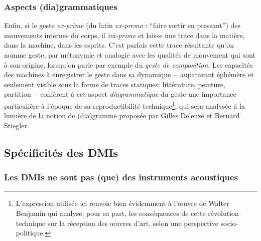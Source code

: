 \subsubsection{Aspects (dia)grammatiques}

\noindent Enfin, si le geste \textit{ex-prime} (du latin \textit{ex-premo} : ``faire sortir en pressant'') des mouvements internes du corps, il \textit{im-prime} et laisse une trace dans la matière, dans la machine, dans les esprits. C'est parfois cette trace résultante qu'on nomme geste, par métonymie et analogie avec les qualités de mouvement qui sont à son origine, lorsqu'on parle par exemple du \textit{geste de composition}. Les capacités des machines à enregistrer le geste dans sa dynamique --~auparavant éphémère et seulement visible sous la forme de traces statiques: littérature, peinture, partition~-- confèrent à cet aspect \textit{diagrammatique} du geste une importance particulière à l'époque de sa reproductibilité technique\footnote{L'expression utilisée ici renvoie bien évidemment à l'œuvre de Walter Benjamin \cite{benjamin_loeuvre_2013} qui analyse, pour sa part, les conséquences de cette révolution technique sur la réception des œuvres d'art, selon une perspective socio-politique.}, qui sera analysée à la lumière de la notion de (dia)gramme proposée par Gilles Deleuze et Bernard Stiegler.




\subsection{Spécificités des DMIs}

\subsubsection{Les DMIs ne sont pas (que) des instruments acoustiques}

